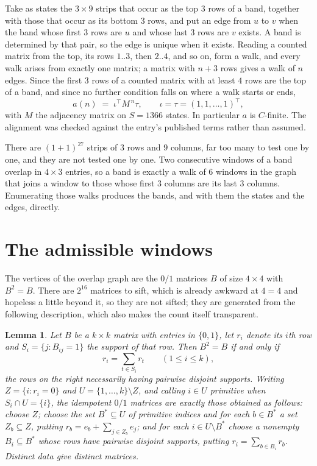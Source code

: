 \documentclass[11pt,a4paper]{article}
\theoremstyle{plain}
\newtheorem{lemma}[theorem]{Lemma}
\theoremstyle{definition}
\begin{document}
Take as states the $3\times9$ strips that occur as the top $3$ rows of a band,
together with those that occur as its bottom $3$ rows, and put an edge from $u$ to $v$
when the band whose first $3$ rows are $u$ and whose last $3$ rows are $v$ exists.
A band is determined by that pair, so the edge is unique when it exists. Reading a counted
matrix from the top, its rows $1..3$, then $2..4$, and so on, form a walk, and every
walk arises from exactly one matrix; a matrix with $n+3$ rows gives a walk of $n$ edges.
Since the first $3$ rows of a counted matrix with at least $4$ rows are the top of a
band, and since no further condition falls on where a walk starts or ends,
\[
a(n)\;=\;\iota^{\!\top}M^{\,n}\tau ,\qquad \iota=\tau=(1,1,\dots,1)^{\!\top},
\]
with $M$ the adjacency matrix on $S=1366$ states. In particular $a$ is $C$-finite. The
alignment was checked against the entry's published terms rather than assumed.

There are $(1 + 1)^{27}$ strips of $3$ rows and $9$ columns, far too
many to test one by one, and they are not tested one by one. Two consecutive windows of a band
overlap in $4\times3$ entries, so a band is exactly a walk of $6$ windows in
the graph that joins a window to those whose first $3$ columns are its last $3$
columns. Enumerating those walks produces the bands, and with them the states and the edges,
directly.

\section{The admissible windows}

The vertices of the overlap graph are the $0/1$ matrices $B$ of size $4\times4$ with
$B^2=B$. There are $2^{16}$ matrices to sift, which is already awkward at $4=4$ and
hopeless a little beyond it, so they are not sifted; they are generated from the following
description, which also makes the count itself transparent.

\begin{lemma}\label{lem:idem}
Let $B$ be a $k\times k$ matrix with entries in $\{0,1\}$, let $r_i$ denote its $i$th row and
$S_i=\{j:B_{ij}=1\}$ the support of that row. Then $B^2=B$ if and only if
\[
r_i=\sum_{t\in S_i}r_t \qquad (1\le i\le k),
\]
the rows on the right necessarily having pairwise disjoint supports. Writing
$Z=\{i:r_i=0\}$ and $U=\{1,\dots,k\}\setminus Z$, and calling $i\in U$ \emph{primitive}
when $S_i\cap U=\{i\}$, the idempotent $0/1$ matrices are exactly those obtained as follows:
choose $Z$; choose the set $B^{\ast}\subseteq U$ of primitive indices and for each
$b\in B^{\ast}$ a set $Z_b\subseteq Z$, putting $r_b=e_b+\sum_{j\in Z_b}e_j$; and for each
$i\in U\setminus B^{\ast}$ choose a nonempty $B_i\subseteq B^{\ast}$ whose rows have
pairwise disjoint supports, putting $r_i=\sum_{b\in B_i}r_b$. Distinct data give distinct
matrices.
\end{lemma}
\end{document}
